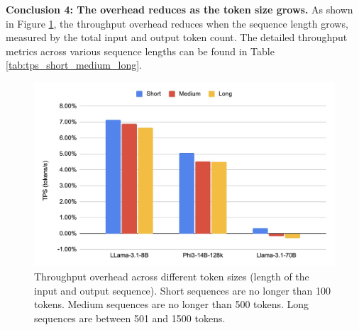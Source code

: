 \documentclass{article}
\begin{document}
\noindent\textbf{Conclusion 4: The overhead reduces as the token size grows.} As shown in Figure \ref{fig:tps-overhead-vs-token-size}, the throughput overhead reduces when the sequence length grows, measured by the total input and output token count. The detailed throughput metrics across various sequence lengths can be found in Table \ref{tab:tps_short_medium_long}.

\begin{figure}
    \centering
    \includegraphics[width=0.7\linewidth]{tps-vs-token-size.png}
    \caption{Throughput overhead across different token sizes (length of the input and output sequence). Short sequences are no longer than 100 tokens. Medium sequences are no longer than 500 tokens. Long sequences are between 501 and 1500 tokens.}
    \label{fig:tps-overhead-vs-token-size}
\end{figure}
\end{document}
